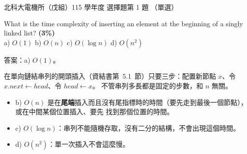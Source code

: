 \begin{pastexam}[label={px:ntut-115-ee-ds-11}]{北科大電機所（戊組）115 學年度 選擇題第 1 題}
（單選）

What is the time complexity of inserting an element at the beginning of a singly linked list?
\textbf{(3\%)}\\
a) $O(1)$ \qquad b) $O(n)$ \qquad c) $O(\log n)$ \qquad d) $O(n^2)$
\end{pastexam}

\begin{pastsoln}
答案：a) $O(1)$。

在單向鏈結串列的開頭插入（資結書第~5.1~節）只要三步：配置新節點 $x$、令 $x.\mathit{next} \gets \mathit{head}$、令
$\mathit{head} \gets x$。 不管串列多長都是固定的步數，和 $n$ 無關。
\begin{itemize}
\item b) $O(n)$ 是在\textbf{尾端}插入而且沒有尾指標時的時間（要先走到最後一個節點），或在中間某個位置插入、要先
找到那個位置的時間。
\item c) $O(\log n)$：串列不能隨機存取，沒有二分的結構，不會出現這個時間。
\item d) $O(n^2)$：單一次插入不會這麼慢。
\end{itemize}
\end{pastsoln}
